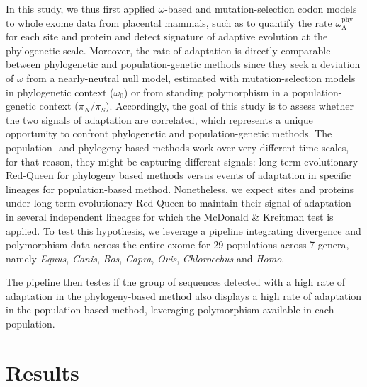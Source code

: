 \documentclass{article}
\newcommand{\rateApop}{\omega_{\mathrm{A}}}
\newcommand{\rateAphy}{\rateApop^{\mathrm{phy}}}
\newcommand{\pn}{\pi_N}
\newcommand{\ps}{\pi_S}
\newcommand{\pnps}{\pn / \ps}
\begin{document}
    In this study, we thus first applied $\omega$-based and mutation-selection codon models to whole exome data from placental mammals, such as to quantify the rate $\rateAphy$ for each site and protein and detect signature of adaptive evolution at the phylogenetic scale.
    Moreover, the rate of adaptation is directly comparable between phylogenetic and population-genetic methods since they seek a deviation of $\omega$ from a nearly-neutral null model, estimated with mutation-selection models in phylogenetic context ($\omega_{0}$) or from standing polymorphism in a population-genetic context ($\pnps$).
    Accordingly, the goal of this study is to assess whether the two signals of adaptation are correlated, which represents a unique opportunity to confront phylogenetic and population-genetic methods.
    The population- and phylogeny-based methods work over very different time scales, for that reason, they might be capturing different signals: long-term evolutionary Red-Queen for phylogeny based methods versus events of adaptation in specific lineages for population-based method.
    Nonetheless, we expect sites and proteins under long-term evolutionary Red-Queen to maintain their signal of adaptation in several independent lineages for which the McDonald \& Kreitman test is applied.
    To test this hypothesis, we leverage a pipeline integrating divergence and polymorphism data across the entire exome for 29 populations across 7 genera, namely \textit{Equus}, \textit{Canis}, \textit{Bos}, \textit{Capra}, \textit{Ovis}, \textit{Chlorocebus} and \textit{Homo}.

    The pipeline then testes if the group of sequences detected with a high rate of adaptation in the phylogeny-based method also displays a high rate of adaptation in the population-based method, leveraging polymorphism available in each population.

    \section*{Results}\label{sec:results}
\end{document}
